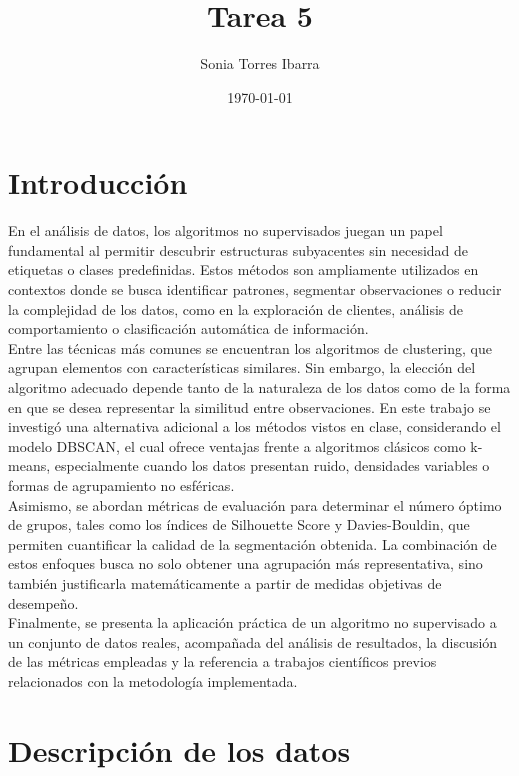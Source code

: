 \documentclass{article}
\title{Tarea 5}
\author{Sonia Torres Ibarra}
\date{\today}
\begin{document}
\maketitle

\section{Introducción}

En el análisis de datos, los algoritmos no supervisados juegan un papel fundamental al permitir descubrir estructuras subyacentes sin necesidad de etiquetas o clases predefinidas. Estos métodos son ampliamente utilizados en contextos donde se busca identificar patrones, segmentar observaciones o reducir la complejidad de los datos, como en la exploración de clientes, análisis de comportamiento o clasificación automática de información.\\

Entre las técnicas más comunes se encuentran los algoritmos de clustering, que agrupan elementos con características similares. Sin embargo, la elección del algoritmo adecuado depende tanto de la naturaleza de los datos como de la forma en que se desea representar la similitud entre observaciones. En este trabajo se investigó una alternativa adicional a los métodos vistos en clase, considerando el modelo DBSCAN, el cual ofrece ventajas frente a algoritmos clásicos como k-means, especialmente cuando los datos presentan ruido, densidades variables o formas de agrupamiento no esféricas.\\

Asimismo, se abordan métricas de evaluación para determinar el número óptimo de grupos, tales como los índices de Silhouette Score y Davies-Bouldin, que permiten cuantificar la calidad de la segmentación obtenida. La combinación de estos enfoques busca no solo obtener una agrupación más representativa, sino también justificarla matemáticamente a partir de medidas objetivas de desempeño.\\

Finalmente, se presenta la aplicación práctica de un algoritmo no supervisado a un conjunto de datos reales, acompañada del análisis de resultados, la discusión de las métricas empleadas y la referencia a trabajos científicos previos relacionados con la metodología implementada.
\clearpage
\section{Descripción de los datos}
\end{document}
